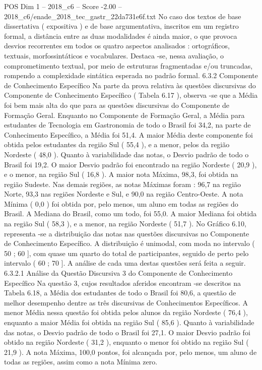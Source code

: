 \begin{textsample}{POS Dim 1 – 2018\_c6 – Score -2.00 – 2018\_c6/enade\_2018\_tec\_gastr\_22da731e6f.txt}
No caso dos textos de base dissertativa ( expositiva ) e de base argumentativa, inscritos em um registro formal, a distância entre as duas modalidades é ainda maior, o que provoca desvios recorrentes em todos os quatro aspectos analisados : ortográficos, textuais, morfossintáticos e vocabulares.
Destaca -se, nessa avaliação, o comprometimento textual, por meio de estruturas fragmentadas e/ou truncadas, rompendo a complexidade sintática esperada no padrão formal. 6.3.2 Componente de Conhecimento Específico Na parte da prova relativa às questões discursivas do Componente de Conhecimento Específico ( Tabela 6.17 ), observa -se que a Média foi bem mais alta do que para as questões discursivas do Componente de Formação Geral.
Enquanto no Componente de Formação Geral, a Média para estudantes de Tecnologia em Gastronomia de todo o Brasil foi 34,2, na parte de Conhecimento Específico, a Média foi 51,4.
A maior Média deste componente foi obtida pelos estudantes da região Sul ( 55,4 ), e a menor, pelos da região Nordeste ( 48,0 ).
Quanto à variabilidade das notas, o Desvio padrão de todo o Brasil foi 19,2.
O maior Desvio padrão foi encontrado na região Nordeste ( 20,9 ), e o menor, na região Sul ( 16,8 ).
A maior nota Máxima, 98,3, foi obtida na região Sudeste.
Nas demais regiões, as notas Máximas foram : 96,7 na região Norte, 93,3 nas regiões Nordeste e Sul, e 90,0 na região Centro-Oeste.
A nota Mínima ( 0,0 ) foi obtida por, pelo menos, um aluno em todas as regiões do Brasil.
A Mediana do Brasil, como um todo, foi 55,0.
A maior Mediana foi obtida na região Sul ( 58,3 ), e a menor, na região Nordeste ( 51,7 ).
No Gráfico 6.10, representa -se a distribuição das notas nas questões discursivas no Componente de Conhecimento Específico.
A distribuição é unimodal, com moda no intervalo ( 50 ; 60 ], com quase um quarto do total de participantes, seguido de perto pelo intervalo ( 60 ; 70 ].
A análise de cada uma destas questões será feita a seguir. 6.3.2.1 Análise da Questão Discursiva 3 do Componente de Conhecimento Específico Na questão 3, cujos resultados aferidos encontram -se descritos na Tabela 6.18, a Média dos estudantes de todo o Brasil foi 80,6, a questão de melhor desempenho dentre as três discursivas de Conhecimentos Específicos.
A menor Média nessa questão foi obtida pelos alunos da região Nordeste ( 76,4 ), enquanto a maior Média foi obtida na região Sul ( 85,6 ).
Quanto à variabilidade das notas, o Desvio padrão de todo o Brasil foi 27,1.
O maior Desvio padrão foi obtido na região Nordeste ( 31,2 ), enquanto o menor foi obtido na região Sul ( 21,9 ).
A nota Máxima, 100,0 pontos, foi alcançada por, pelo menos, um aluno de todas as regiões, assim como a nota Mínima zero.

\end{textsample}
